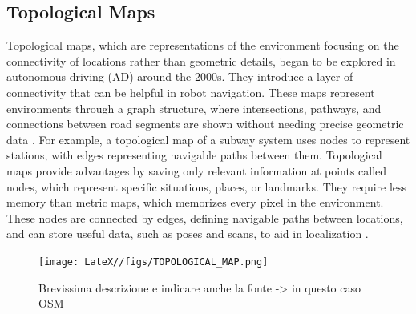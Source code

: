 \subsection{Topological Maps}
Topological maps, which are representations of the environment focusing on the connectivity of locations rather than geometric details, began to be explored in autonomous driving (AD) around the 2000s. They introduce a layer of connectivity that can be helpful in robot navigation. These maps represent environments through a graph structure, where intersections, pathways, and connections between road segments are shown without needing precise geometric data \cite{li2020survey}. For example, a topological map of a subway system uses nodes to represent stations, with edges representing navigable paths between them. \cite{8105770}
Topological maps provide advantages by saving only relevant information at points called nodes, which represent specific situations, places, or landmarks. They require less memory than metric maps, which memorizes every pixel in the environment. These nodes are connected by edges, defining navigable paths between locations, and can store useful data, such as poses and scans, to aid in localization \cite{murciego2021topological}.
\begin{figure}[H]
    \centering
    \texttt{[image: LateX//figs/TOPOLOGICAL\_MAP.png]}
    \caption{Brevissima descrizione e indicare anche la fonte -> in questo caso OSM}
    \label{fig:enter-label}
\end{figure}

